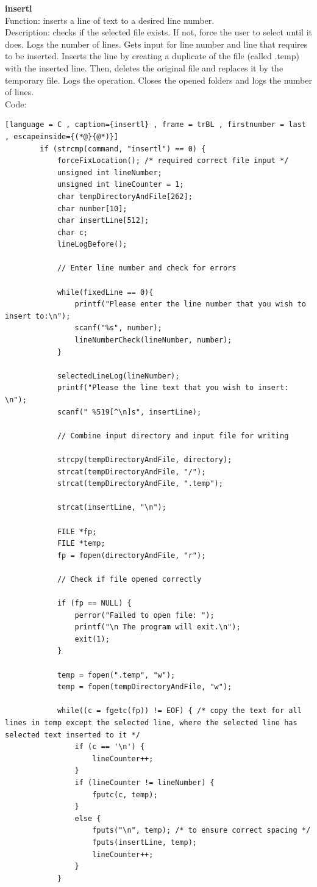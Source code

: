 \documentclass[a4paper]{article}
\theoremstyle{plain}
\theoremstyle{definition}
\theoremstyle{remark}
\begin{document}
\textbf{insertl} \\
Function: inserts a line of text to a desired line number. \\
Description: checks if the selected file exists. If not, force the user to select until it does.  Logs the number of lines. Gets input for line number and line that requires to be inserted. Inserts the line by creating a duplicate of the file (called .temp) with the inserted line. Then, deletes the original file and replaces it by the temporary file. Logs the operation. Closes the opened folders and logs the number of lines. \\
Code:
\begin{lstlisting}[language = C , caption={insertl} , frame = trBL , firstnumber = last , escapeinside={(*@}{@*)}]
		if (strcmp(command, "insertl") == 0) {
			forceFixLocation(); /* required correct file input */
			unsigned int lineNumber;
			unsigned int lineCounter = 1;
			char tempDirectoryAndFile[262];
			char number[10];
			char insertLine[512];
			char c;
			lineLogBefore();

			// Enter line number and check for errors

			while(fixedLine == 0){
				printf("Please enter the line number that you wish to insert to:\n");
				scanf("%s", number);
				lineNumberCheck(lineNumber, number);
			}

			selectedLineLog(lineNumber);
			printf("Please the line text that you wish to insert: \n");
			scanf(" %519[^\n]s", insertLine);

			// Combine input directory and input file for writing

			strcpy(tempDirectoryAndFile, directory);
			strcat(tempDirectoryAndFile, "/");
			strcat(tempDirectoryAndFile, ".temp");

			strcat(insertLine, "\n");

			FILE *fp;
			FILE *temp;
			fp = fopen(directoryAndFile, "r");

			// Check if file opened correctly

			if (fp == NULL) {
    			perror("Failed to open file: ");
				printf("\n The program will exit.\n");
    			exit(1);
			}

			temp = fopen(".temp", "w");
			temp = fopen(tempDirectoryAndFile, "w");
			
			while((c = fgetc(fp)) != EOF) { /* copy the text for all lines in temp except the selected line, where the selected line has selected text inserted to it */
				if (c == '\n') {
					lineCounter++;
				}
				if (lineCounter != lineNumber) {
					fputc(c, temp);
				}
				else {
					fputs("\n", temp); /* to ensure correct spacing */
					fputs(insertLine, temp);
					lineCounter++;
				}
			}
\end{lstlisting}
\end{document}
